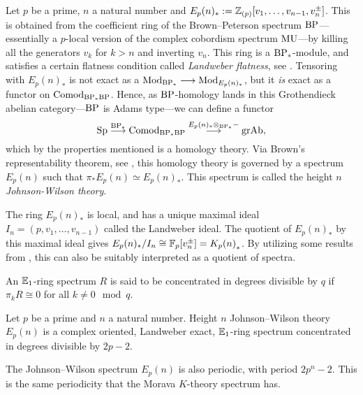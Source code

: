 \begin{construction}
    Let $p$ be a prime, $n$ a natural number and $E_p(n)_* := \mathbb{Z}_{(p)}[v_1, \ldots, v_{n-1}, v_n^{\pm}]$. This is obtained from the coefficient ring of the Brown--Peterson spectrum $\mathrm{BP}$---essentially a $p$-local version of the complex cobordism spectrum $\mathrm{MU}$---by killing all the generators $v_k$ for $k>n$ and inverting $v_n$. This ring is a $\mathrm{BP}_*$-module, and satisfies a certain flatness condition called \emph{Landweber flatness}, see \cite{landweber_76}. Tensoring with $E_p(n)_*$ is not exact as a $\mathrm{Mod}_{\mathrm{BP}_*}\longrightarrow \mathrm{Mod}_{E_p(n)_*}$, but it \emph{is} exact as a functor on $\mathrm{Comod}_{\mathrm{BP}_*\mathrm{BP}}$. Hence, as $\mathrm{BP}$-homology lands in this Grothendieck abelian category---$\mathrm{BP}$ is Adams type---we can define a functor 
    \[\mathrm{Sp} \overset{\mathrm{BP}_*}{\longrightarrow} \mathrm{Comod}_{\mathrm{BP}_*\mathrm{BP}}\overset{E_p(n)_*\otimes_{\mathrm{BP}_*}-}{\longrightarrow} \mathrm{gr}\mathrm{Ab},\]
    which by the properties mentioned is a homology theory. Via Brown's representability theorem, see \cite[Theorem 1]{brown_1962}, this homology theory is governed by a spectrum $E_p(n)$ such that $\pi_* E_p(n) \simeq E_p(n)_*$. This spectrum is called the height $n$ \emph{Johnson-Wilson theory}. 
\end{construction}

\begin{remark}
    \label{ch0:rm:K-as-quotient-of-E}
    The ring $E_p(n)_*$ is local, and has a unique maximal ideal $I_n = (p, v_1, \ldots, v_{n-1})$ called the Landweber ideal. The quotient of $E_p(n)_*$ by this maximal ideal gives $E_p(n)_*/I_n \cong \mathbb{F}_p[v_n^{\pm}] = {K_p(n)}_*$. By utilizing some results from \cite{elmanto-kolderup_2020}, this can also be suitably interpreted as a quotient of spectra. 
\end{remark}

\begin{definition}
    An $\mathbb{E}_1$-ring spectrum $R$ is said to be concentrated in degrees divisible by $q$ if $\pi_k R \cong 0$ for all $k \not = 0 \mod q$. 
\end{definition}

\begin{proposition}
    \label{ch0:prop:Johnson-Wilson-properties}
    Let $p$ be a prime and $n$ a natural number. Height $n$ Johnson--Wilson theory $E_p(n)$ is a complex oriented, Landweber exact, $\mathbb{E}_1$-ring spectrum concentrated in degrees divisible by $2p-2$. 
\end{proposition}

\begin{remark}
    The Johnson--Wilson spectrum $E_p(n)$ is also periodic, with period $2p^n-2$. This is the same periodicity that the Morava $K$-theory spectrum has. 
\end{remark}

